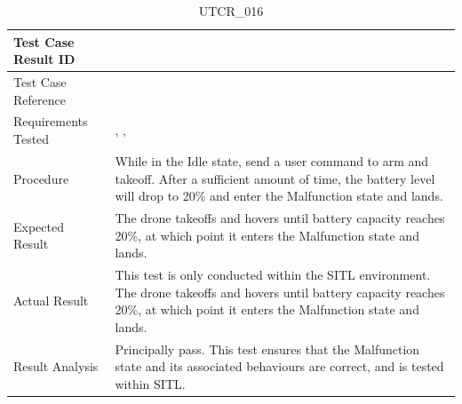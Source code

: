 \documentclass[12pt, titlepage]{article}
\begin{document}
\begin{table}[!h]
\begin{center}
\caption {UTCR\_016}
\label{tab:UTCR_016}
\begin{tabular}{ | m{3.2cm} | m{12.2cm} | } 
\hline
Test Case Result ID & \nameref{tab:UTCR_016} \\ 
\hline
Test Case Reference & \nameref{tab:UTC_016}  \\ 
\hline
Requirements Tested & \nameref{STA_009}, \nameref{SR_007}, \nameref{SR_011} \\ 
\hline
Procedure & While in the Idle state, send a user command to arm and takeoff. After a sufficient amount of time, the battery level will drop to 20\% and enter the Malfunction state and lands. \\ 
\hline
Expected Result & The drone takeoffs and hovers until battery capacity reaches 20\%, at which point it enters the Malfunction state and lands. \\
\hline
Actual Result & This test is only conducted within the SITL environment. The drone takeoffs and hovers until battery capacity reaches 20\%, at which point it enters the Malfunction state and lands. \\
\hline
Result Analysis & Principally pass. This test ensures that the Malfunction state and its associated behaviours are correct, and is tested within SITL. \\ 
\hline
\end{tabular}
\end{center}
\end{table}
\end{document}
